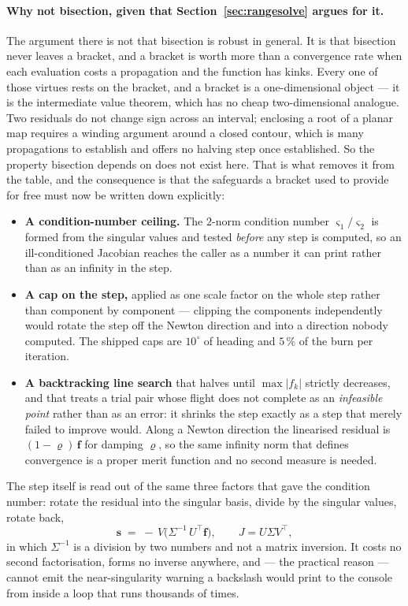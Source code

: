 \documentclass[11pt]{article}
\begin{document}
\paragraph{Why not bisection, given that Section~\ref{sec:rangesolve} argues
for it.} The argument there is not that bisection is robust in general. It is
that bisection never leaves a bracket, and a bracket is worth more than a
convergence rate when each evaluation costs a propagation and the function has
kinks. Every one of those virtues rests on the bracket, and a bracket is a
one-dimensional object --- it is the intermediate value theorem, which has no
cheap two-dimensional analogue. Two residuals do not change sign across an
interval; enclosing a root of a planar map requires a winding argument around a
closed contour, which is many propagations to establish and offers no
halving step once established. So the property bisection depends on does not
exist here. That is what removes it from the table, and the consequence is
that the safeguards a bracket used to provide for free must now be written
down explicitly:

\begin{itemize}
\item \textbf{A condition-number ceiling.} The $2$-norm condition number
$\varsigma_1/\varsigma_2$ is formed from the singular values and tested
\emph{before} any step is computed, so an ill-conditioned Jacobian reaches the
caller as a number it can print rather than as an infinity in the step.
\item \textbf{A cap on the step,} applied as one scale factor on the whole
step rather than component by component --- clipping the components
independently would rotate the step off the Newton direction and into a
direction nobody computed. The shipped caps are $10^{\circ}$ of heading and
$5\,\%$ of the burn per iteration.
\item \textbf{A backtracking line search} that halves until
$\max|f_k|$ strictly decreases, and that treats a trial pair whose flight does
not complete as an \emph{infeasible point} rather than as an error: it shrinks
the step exactly as a step that merely failed to improve would. Along a Newton
direction the linearised residual is $(1-\varrho)\,\mathbf{f}$ for damping
$\varrho$, so the same infinity norm that defines convergence is a proper
merit function and no second measure is needed.
\end{itemize}

The step itself is read out of the same three factors that gave the condition
number: rotate the residual into the singular basis, divide by the singular
values, rotate back,
\begin{equation}
  \mathbf{s} \;=\; -\,V\bigl(\Sigma^{-1}\,U^{\!\top}\mathbf{f}\bigr),
  \qquad J = U\Sigma V^{\!\top},
  \label{eq:newtonstep}
\end{equation}
in which $\Sigma^{-1}$ is a division by two numbers and not a matrix inversion.
It costs no second factorisation, forms no inverse anywhere, and --- the practical
reason --- cannot emit the near-singularity warning a backslash would print to
the console from inside a loop that runs thousands of times.
\end{document}
